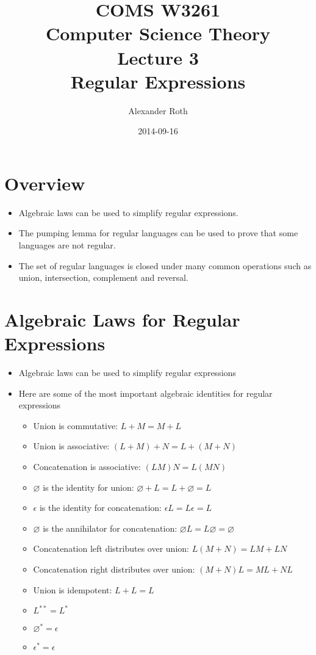 \documentclass[]{article}
\begin{document}
\title{COMS W3261 \\ Computer Science Theory \\ Lecture 3\\ Regular Expressions}
\author{Alexander Roth}
\date{2014-09-16}
\maketitle

\section*{Overview}
  \begin{itemize}
    \item Algebraic laws can be used to simplify regular expressions.
    \item The pumping lemma for regular languages can be used to prove that some
    languages are not regular.
    \item The set of regular languages is closed under many common operations
    such as union, intersection, complement and reversal.
  \end{itemize}

\section{Algebraic Laws for Regular Expressions}
  \begin{itemize}
    \item Algebraic laws can be used to simplify regular expressions
    \item Here are some of the most important algebraic identities for regular
    expressions
      \begin{itemize}
        \item Union is commutative: $L + M = M + L$
        \item Union is associative: $(L + M) + N = L + (M + N)$
        \item Concatenation is associative: $(LM)N = L(MN)$
        \item $\varnothing$ is the identity for union: $\varnothing + L = L +
        \varnothing = L$
        \item $\epsilon$ is the identity for concatenation: $\epsilon{L} = L
        \epsilon = L$
        \item $\varnothing$ is the annihilator for concatenation: $
        \varnothing{L} = L\varnothing = \varnothing$
        \item Concatenation left distributes over union: $L(M + N) = LM + LN$
        \item Concatenation right distributes over union: $(M + N)L = ML + NL$
        \item Union is idempotent: $L + L = L$
        \item $L^{**} = L^*$
        \item $\varnothing^{*} = \epsilon$
        \item $\epsilon^* = \epsilon$
      \end{itemize}
  \end{itemize}
\end{document}
